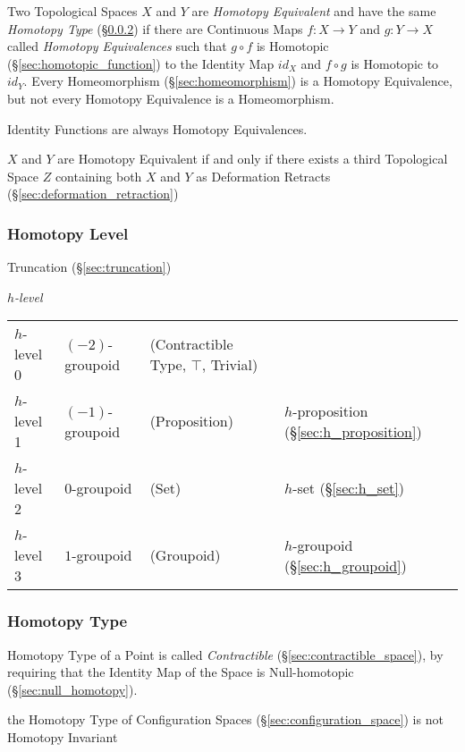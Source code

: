Two Topological Spaces $X$ and $Y$ are \emph{Homotopy Equivalent} and
have the same \emph{Homotopy Type} (\S\ref{sec:homotopy_type}) if
there are Continuous Maps $f : X \rightarrow Y$ and $g : Y \rightarrow
X$ called \emph{Homotopy Equivalences} such that $g \circ f$ is
Homotopic (\S\ref{sec:homotopic_function}) to the Identity Map $id_X$
and $f \circ g$ is Homotopic to $id_Y$. Every Homeomorphism
(\S\ref{sec:homeomorphism}) is a Homotopy Equivalence, but not every
Homotopy Equivalence is a Homeomorphism.

Identity Functions are always Homotopy Equivalences. %

$X$ and $Y$ are Homotopy Equivalent if and only if there exists a
third Topological Space $Z$ containing both $X$ and $Y$ as Deformation
Retracts (\S\ref{sec:deformation_retraction})



\subsubsection{Homotopy Level}\label{sec:homotopy_level}

Truncation (\S\ref{sec:truncation})

\emph{$h$-level}

\begin{tabular}{l l l l}
$h$-level 0   & $(-2)$-groupoid & (Contractible Type, $\top$, Trivial)
  & \\
$h$-level 1   & $(-1)$-groupoid & (Proposition)
  & $h$-proposition (\S\ref{sec:h_proposition}) \\
$h$-level 2   & $0$-groupoid    & (Set)
  & $h$-set (\S\ref{sec:h_set}) \\
$h$-level 3   & $1$-groupoid    & (Groupoid)
  & $h$-groupoid (\S\ref{sec:h_groupoid}) \\
\end{tabular}



\subsubsection{Homotopy Type}\label{sec:homotopy_type}

Homotopy Type of a Point is called \emph{Contractible}
(\S\ref{sec:contractible_space}), by requiring that the Identity Map
of the Space is Null-homotopic (\S\ref{sec:null_homotopy}).

the Homotopy Type of Configuration Spaces (\S\ref{sec:configuration_space}) is
not Homotopy Invariant



